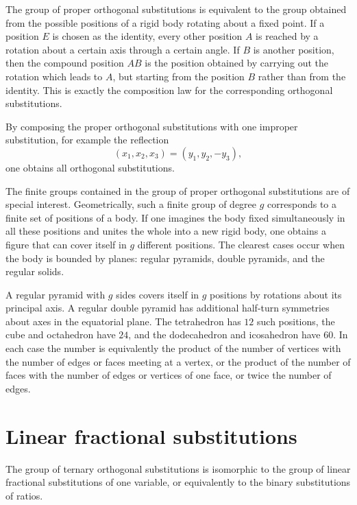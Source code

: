 \documentclass[11pt,a4paper]{book}
\begin{document}
The group of proper orthogonal substitutions is equivalent to the group obtained from the possible positions of a rigid body rotating about a fixed point.  If a position $E$ is chosen as the identity, every other position $A$ is reached by a rotation about a certain axis through a certain angle.  If $B$ is another position, then the compound position $AB$ is the position obtained by carrying out the rotation which leads to $A$, but starting from the position $B$ rather than from the identity.  This is exactly the composition law for the corresponding orthogonal substitutions.

By composing the proper orthogonal substitutions with one improper substitution, for example the reflection
\[
 (x_1,x_2,x_3)=(y_1,y_2,-y_3),
\]
one obtains all orthogonal substitutions.

The finite groups contained in the group of proper orthogonal substitutions are of special interest.  Geometrically, such a finite group of degree $g$ corresponds to a finite set of positions of a body.  If one imagines the body fixed simultaneously in all these positions and unites the whole into a new rigid body, one obtains a figure that can cover itself in $g$ different positions.  The clearest cases occur when the body is bounded by planes: regular pyramids, double pyramids, and the regular solids.

A regular pyramid with $g$ sides covers itself in $g$ positions by rotations about its principal axis.  A regular double pyramid has additional half-turn symmetries about axes in the equatorial plane.  The tetrahedron has $12$ such positions, the cube and octahedron have $24$, and the dodecahedron and icosahedron have $60$.  In each case the number is equivalently the product of the number of vertices with the number of edges or faces meeting at a vertex, or the product of the number of faces with the number of edges or vertices of one face, or twice the number of edges.

\section{Linear fractional substitutions}

The group of ternary orthogonal substitutions is isomorphic to the group of linear fractional substitutions of one variable, or equivalently to the binary substitutions of ratios.
\end{document}

